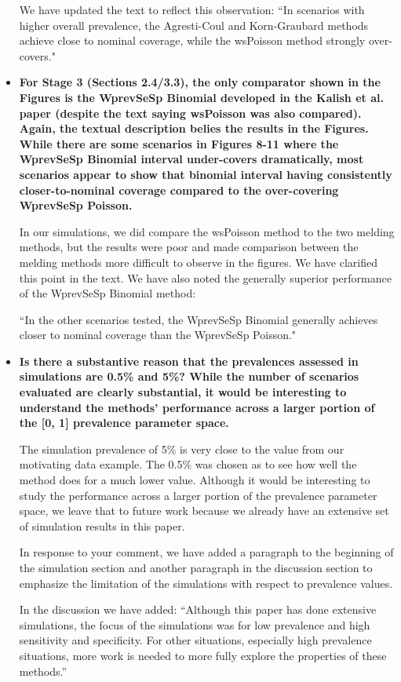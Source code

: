 \documentclass[11pt]{article}
\begin{document}
\begin{itemize}
    We have updated the text to reflect this observation:
    ``In scenarios with higher overall prevalence, the Agresti-Coul and Korn-Graubard methods achieve close to nominal coverage, while the wsPoisson method strongly over-covers."

    \item \textbf{For Stage 3 (Sections 2.4/3.3), the only comparator shown in the Figures is the WprevSeSp Binomial developed in the Kalish et al. paper (despite the text saying wsPoisson was also compared). Again, the textual description belies the results in the Figures. While there are some scenarios in Figures 8-11 where the WprevSeSp Binomial interval under-covers dramatically, most scenarios appear to show that binomial interval having consistently closer-to-nominal coverage compared to the over-covering WprevSeSp Poisson.}
    
    In our simulations, we did compare the wsPoisson method to the two melding methods, but the results were poor and made comparison between the melding methods more difficult to observe in the figures.
    We have clarified this point in the text.
    We have also noted the generally superior performance of the WprevSeSp Binomial method:
    
    ``In the other scenarios tested, the WprevSeSp Binomial generally achieves closer to nominal coverage than the WprevSeSp Poisson."

    \item \textbf{Is there a substantive reason that the prevalences assessed in simulations are 0.5\% and 5\%? While the number of scenarios evaluated are clearly substantial, it would be interesting to understand the methods’ performance across a larger portion of the [0, 1] prevalence parameter space.}

The simulation prevalence of 5\% is very close to the value from our motivating data example.
The 0.5\% was chosen as to see how well the method does for a much lower value. 
Although it would be interesting to study the performance across a larger portion of the prevalence parameter space, we leave that to future work because we already have an extensive set of simulation results in this paper. 

In response to your comment, we have added a paragraph to the beginning of the simulation section and another paragraph in the discussion section to emphasize the limitation of the simulations with respect to prevalence values. 

In the discussion we have added: ``Although this paper has done extensive simulations, the focus of the simulations was for low prevalence and high 
sensitivity and specificity. For other situations, especially high prevalence situations, more work is needed to more fully explore the properties of these methods.'' 



\end{itemize}
\end{document}
